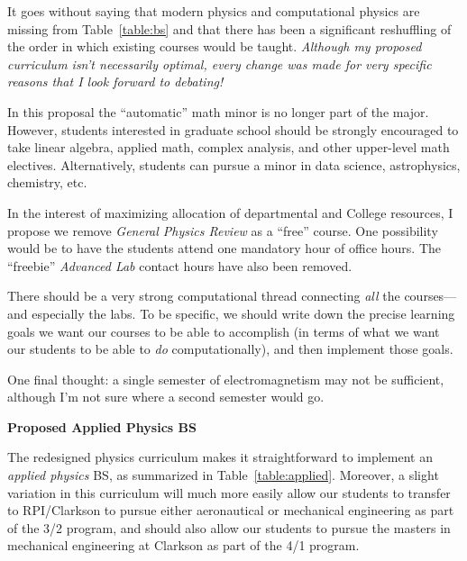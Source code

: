 \documentclass[12pt,preprint]{aastex}
\begin{document}
\vspace{-4mm}
\begin{itemize*}
\item{It goes without saying that modern physics and computational physics are
  missing from Table~\ref{table:bs} and that there has been a significant
  reshuffling of the order in which existing courses would be taught.  {\em
    Although my proposed curriculum isn't necessarily optimal, every change was
    made for very specific reasons that I look forward to debating!}}
\item{In this proposal the ``automatic'' math minor is no longer part of the
  major.  However, students interested in graduate school should be strongly
  encouraged to take linear algebra, applied math, complex analysis, and other
  upper-level math electives.  Alternatively, students can pursue a minor in
  data science, astrophysics, chemistry, etc.}
\item{In the interest of maximizing allocation of departmental and College
  resources, I propose we remove {\em General Physics Review} as a ``free''
  course.  One possibility would be to have the students attend one mandatory
  hour of office hours.  The ``freebie'' {\em Advanced Lab} contact hours have
  also been removed.}
\item{There should be a very strong computational thread connecting \emph{all}
  the courses---and especially the labs.  To be specific, we should write down
  the precise learning goals we want our courses to be able to accomplish (in
  terms of what we want our students to be able to \emph{do} computationally),
  and then implement those goals.} 
\item{One final thought: a single semester of electromagnetism may not be
  sufficient, although I'm not sure where a second semester would go.} 
\end{itemize*}


\vspace{2mm}
{\large \sc \textbf{Proposed Applied Physics BS}}

The redesigned physics curriculum makes it straightforward to implement an {\em
  applied physics} BS, as summarized in Table~\ref{table:applied}.  Moreover, a
slight variation in this curriculum will much more easily allow our students to
transfer to RPI/Clarkson to pursue either aeronautical or mechanical engineering
as part of the 3/2 program, and should also allow our students to pursue the
masters in mechanical engineering at Clarkson as part of the 4/1 program.
\end{document}
